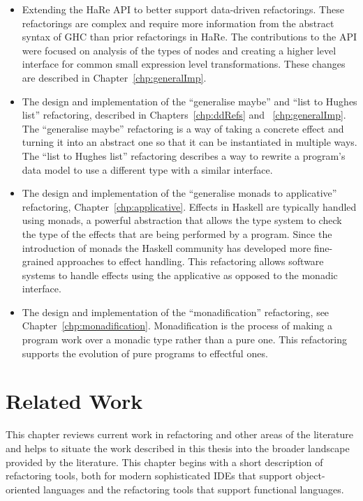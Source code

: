 \begin{itemize}
	\item Extending the HaRe API to better support data-driven refactorings. These refactorings are complex and require more information from the abstract syntax of GHC than prior refactorings in HaRe. The contributions to the API were focused on analysis of the types of nodes and creating a higher level interface for common small expression level transformations. These changes are described in Chapter~\ref{chp:generalImp}.
	\item The design and implementation of the ``generalise maybe'' and ``list to Hughes list'' refactoring, described in Chapters~\ref{chp:ddRefs} and ~\ref{chp:generalImp}. The ``generalise maybe'' refactoring is a way of taking a concrete effect and turning it into an abstract one so that it can be instantiated in multiple ways. The ``list to Hughes list'' refactoring describes a way to rewrite  a program's data model to use a different type with a similar interface.
	\item The design and implementation of the ``generalise monads to applicative'' refactoring, Chapter~\ref{chp:applicative}. Effects in Haskell are typically handled using monads, a powerful abstraction that allows the type system to check the type of the effects that are being performed by a program. Since the introduction of monads the Haskell community has developed more fine-grained approaches to effect handling. This refactoring allows software systems to handle effects using the applicative as opposed to the monadic interface.
	\item The design and implementation of the ``monadification'' refactoring, see Chapter~\ref{chp:monadification}. Monadification is the process of making a program work over a monadic type rather than a pure one. This refactoring supports the evolution of pure programs to effectful ones.
\end{itemize}


\chapter{Related Work}
\label{chp:related}

This chapter reviews current work in refactoring and other areas of the literature and helps to situate the work described in this thesis into the broader landscape provided by the literature. This chapter begins with a short description of refactoring tools, both for modern sophisticated IDEs that support object-oriented languages and the refactoring tools that support functional languages. 

